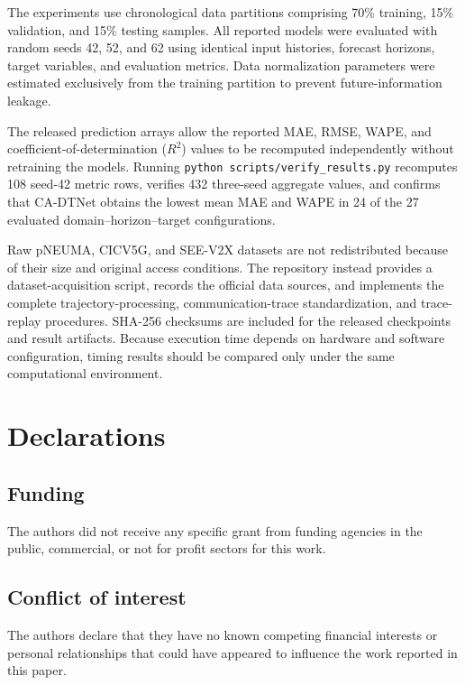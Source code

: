 \documentclass[pdflatex,sn-mathphys-num]{sn-jnl}%
\theoremstyle{thmstyleone}%
\theoremstyle{thmstyletwo}%
\theoremstyle{thmstylethree}%
\begin{document}
The experiments use chronological data partitions comprising 70\% training,
15\% validation, and 15\% testing samples. All reported models were evaluated
with random seeds 42, 52, and 62 using identical input histories, forecast
horizons, target variables, and evaluation metrics. Data normalization
parameters were estimated exclusively from the training partition to prevent
future-information leakage.

The released prediction arrays allow the reported MAE, RMSE, WAPE, and
coefficient-of-determination ($R^2$) values to be recomputed independently
without retraining the models. Running
\texttt{python scripts/verify\_results.py} recomputes 108 seed-42 metric rows,
verifies 432 three-seed aggregate values, and confirms that CA-DTNet obtains
the lowest mean MAE and WAPE in 24 of the 27 evaluated
domain--horizon--target configurations.

Raw pNEUMA, CICV5G, and SEE-V2X datasets are not redistributed because of
their size and original access conditions. The repository instead provides a
dataset-acquisition script, records the official data sources, and implements
the complete trajectory-processing, communication-trace standardization, and
trace-replay procedures. SHA-256 checksums are included for the released
checkpoints and result artifacts. Because execution time depends on hardware
and software configuration, timing results should be compared only under the
same computational environment.


\section*{Declarations}
\label{sec:declarations}

\subsection*{Funding}

The authors did not receive any specific grant from funding agencies in the public, commercial, or not for profit sectors for this work.

\subsection*{Conflict of interest}

The authors declare that they have no known competing financial interests or personal relationships that could have appeared to influence the work reported in this paper.
\end{document}
